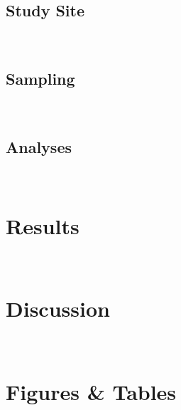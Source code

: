 \subsection*{Study Site}
\lipsum[66]\\
\subsection*{Sampling}
\lipsum[66]\\
\subsection*{Analyses}
\lipsum[66]\\
\section{Results}
\lipsum[66]\\
\section{Discussion}
\lipsum[66]\\

\newpage
\section*{Figures \& Tables}
